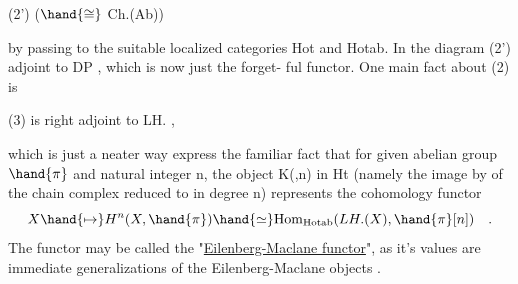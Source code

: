 (2') \qquad {} \quad ($\hand{\cong}$ Ch.(Ab))

by passing to the suitable localized categories Hot and Hotab.  In the
diagram (2')   adjoint to DP ,  which is now just the forget-%
ful functor.   One main fact about (2) is

(3) \qquad {} is right adjoint to LH. \quad ,

which is just a neater way  express the familiar fact that for given
abelian group $\hand{\pi}$ and  natural integer n,  the object K(\hand{$\pi$},n) in  Ht
(namely the image by  of the chain complex\inserted{$\pi[n]$} reduced to \hand{$\pi$} in degree n)
represents the cohomology functor
\[ X \hand{\mapsto} H^n(X, \hand{\pi}) \hand{\simeq} \mathrm{Hom}_{\mathrm{Hotab}}(LH.(X), \hand{\pi}[n]) \quad . \]
The functor  may be called the "\uline{Eilenberg-Maclane functor}",  as it's
values are immediate generalizations of the Eilenberg-Maclane objects
.


